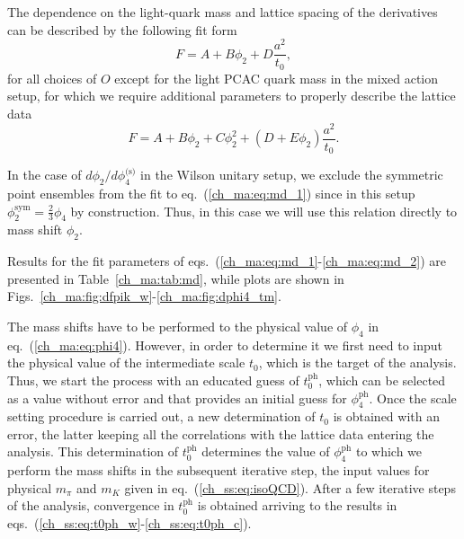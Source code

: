 The dependence on the light-quark mass and lattice spacing of the derivatives can be described by the following fit form
\begin{equation}
\label{ch_ma:eq:md_1}
F=A+B\phi_2+D\frac{a^2}{t_0},
\end{equation}
for all choices of ${O}$ except for the light PCAC quark mass in the mixed action setup, for which we require additional parameters to properly describe the lattice data
\begin{equation}
\label{ch_ma:eq:md_2}
F=A+B\phi_2+C\phi_2^2+(D+E\phi_2)\frac{a^2}{t_0}.
\end{equation}

In the case of $d\phi_2/d\phi_4^{\textrm{(s)}}$ in the Wilson unitary setup, we exclude the symmetric point ensembles from the fit to eq.~(\ref{ch_ma:eq:md_1}) since in this setup $\phi_2^{\textrm{sym}}=\frac{2}{3}\phi_4$ by construction. Thus, in this case we will use this relation directly to mass shift $\phi_2$.

Results for the fit parameters of eqs.~(\ref{ch_ma:eq:md_1}-\ref{ch_ma:eq:md_2}) are presented in Table~\ref{ch_ma:tab:md}, while plots are shown in Figs.~\ref{ch_ma:fig:dfpik_w}-\ref{ch_ma:fig:dphi4_tm}.

The mass shifts have to be performed to the physical value of $\phi_4$ in eq.~(\ref{ch_ma:eq:phi4}). However, in order to determine it we first need to input the physical value of the intermediate scale $t_0$, which is the target of the analysis. Thus, we start the process with an educated guess of $t_0^{\textrm{ph}}$, which can be selected as a value without error and that provides an initial guess for $\phi_4^{\textrm{ph}}$. Once the scale setting procedure is carried out, a new determination of $t_0$ is obtained with an error, the latter keeping all the correlations with the lattice data entering the analysis. This determination of $t_0^{\textrm{ph}}$ determines the value of $\phi_4^{\textrm{ph}}$ to which we perform the mass shifts in the subsequent iterative step, the input values for physical $m_{\pi}$ and $m_K$ given in eq.~(\ref{ch_ss:eq:isoQCD}). After a few iterative steps of the analysis, convergence in $t_0^{\textrm{ph}}$ is obtained arriving to the results in eqs.~(\ref{ch_ss:eq:t0ph_w}-\ref{ch_ss:eq:t0ph_c}).


\newpage

